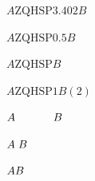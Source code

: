 $A\text{ZQHSP3.402}B$

$A\text{ZQHSP0.5}B$

$A\text{ZQHSP}B$

$A\text{ZQHSP1}B(2)$

$A\hspace{12mm}B$

$A\hspace*{3pt}B$

$A\hspace{\fill}B$
